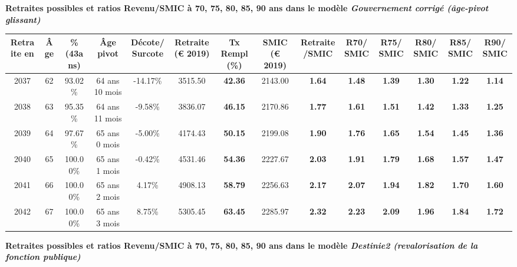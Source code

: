  \vspace{0.1cm} 
{\bf \noindent Retraites possibles et ratios Revenu/SMIC à 70, 75, 80, 85, 90 ans dans le modèle \emph{Gouvernement corrigé (âge-pivot glissant)}}  
 
\begin{adjustbox}{max width=\textwidth} 
\begin{tabular}[htb]{|c|c||c|c|c||c|c||c|c||c|c|c|c|c|} 
\hline 
 Retraite en &  Âge &  \%(43ans) &  Âge pivot &  Décote/Surcote &  Retraite (\euro{} 2019) &  Tx Rempl(\%) &  SMIC (\euro{} 2019) &  Retraite/SMIC &  R70/SMIC &  R75/SMIC &  R80/SMIC &  R85/SMIC &  R90/SMIC \\ 
\hline \hline 
 2037 &  62 &  93.02\% &  64 ans 10 mois &  -14.17\% &  3515.50 &  {\bf 42.36} &  2143.00 &  {\bf 1.64} &  {\bf 1.48} &  {\bf 1.39} &  {\bf 1.30} &  {\bf 1.22} &  {\bf 1.14} \\ 
\hline 
 2038 &  63 &  95.35\% &  64 ans 11 mois &  -9.58\% &  3836.07 &  {\bf 46.15} &  2170.86 &  {\bf 1.77} &  {\bf 1.61} &  {\bf 1.51} &  {\bf 1.42} &  {\bf 1.33} &  {\bf 1.25} \\ 
\hline 
 2039 &  64 &  97.67\% &  65 ans 0 mois &  -5.00\% &  4174.43 &  {\bf 50.15} &  2199.08 &  {\bf 1.90} &  {\bf 1.76} &  {\bf 1.65} &  {\bf 1.54} &  {\bf 1.45} &  {\bf 1.36} \\ 
\hline 
 2040 &  65 &  100.00\% &  65 ans 1 mois &  -0.42\% &  4531.46 &  {\bf 54.36} &  2227.67 &  {\bf 2.03} &  {\bf 1.91} &  {\bf 1.79} &  {\bf 1.68} &  {\bf 1.57} &  {\bf 1.47} \\ 
\hline 
 2041 &  66 &  100.00\% &  65 ans 2 mois &  4.17\% &  4908.13 &  {\bf 58.79} &  2256.63 &  {\bf 2.17} &  {\bf 2.07} &  {\bf 1.94} &  {\bf 1.82} &  {\bf 1.70} &  {\bf 1.60} \\ 
\hline 
 2042 &  67 &  100.00\% &  65 ans 3 mois &  8.75\% &  5305.45 &  {\bf 63.45} &  2285.97 &  {\bf 2.32} &  {\bf 2.23} &  {\bf 2.09} &  {\bf 1.96} &  {\bf 1.84} &  {\bf 1.72} \\ 
\hline 
\hline 
\end{tabular} 
\end{adjustbox} 
 
 \vspace{0.1cm} 
{\bf \noindent Retraites possibles et ratios Revenu/SMIC à 70, 75, 80, 85, 90 ans dans le modèle \emph{Destinie2 (revalorisation de la fonction publique)}}  
 
